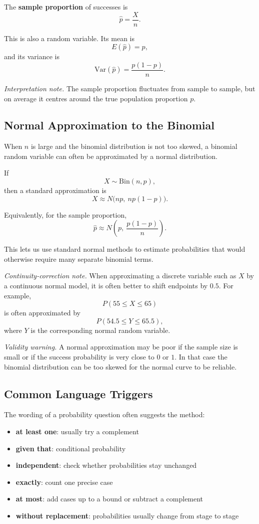 The \textbf{sample proportion} of successes is
\[
\hat p=\frac{X}{n}.
\]

This is also a random variable. Its mean is
\[
E(\hat p)=p,
\]
and its variance is
\[
\mathrm{Var}(\hat p)=\frac{p(1-p)}{n}.
\]

\textit{Interpretation note.} The sample proportion fluctuates from sample to sample, but on average it centres around the true population proportion $p$.

\subsection{Normal Approximation to the Binomial}

When $n$ is large and the binomial distribution is not too skewed, a binomial random variable can often be approximated by a normal distribution.

If
\[
X\sim \mathrm{Bin}(n,p),
\]
then a standard approximation is
\[
X \approx N\big(np,\ np(1-p)\big).
\]

Equivalently, for the sample proportion,
\[
\hat p \approx N\left(p,\ \frac{p(1-p)}{n}\right).
\]

This lets us use standard normal methods to estimate probabilities that would otherwise require many separate binomial terms.

\textit{Continuity-correction note.} When approximating a discrete variable such as $X$ by a continuous normal model, it is often better to shift endpoints by $0.5$. For example,
\[
P(55\le X\le 65)
\]
is often approximated by
\[
P(54.5\le Y\le 65.5),
\]
where $Y$ is the corresponding normal random variable.

\textit{Validity warning.} A normal approximation may be poor if the sample size is small or if the success probability is very close to $0$ or $1$. In that case the binomial distribution can be too skewed for the normal curve to be reliable.

\subsection{Common Language Triggers}

The wording of a probability question often suggests the method:
\begin{itemize}[leftmargin=*]
  \item \textbf{at least one}: usually try a complement
  \item \textbf{given that}: conditional probability
  \item \textbf{independent}: check whether probabilities stay unchanged
  \item \textbf{exactly}: count one precise case
  \item \textbf{at most}: add cases up to a bound or subtract a complement
  \item \textbf{without replacement}: probabilities usually change from stage to stage
\end{itemize}

